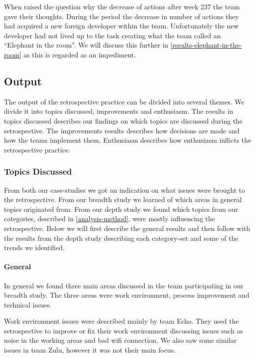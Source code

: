 When raised the question why the decrease of actions after week 237 the team gave their thoughts. During the period the decrease in number of actions they had acquired a new foreign developer within the team. Unfortunately the new developer had not lived up to the task creating what the team called an ``Elephant in the room''. We will discuss this further in \autoref{results-elephant-in-the-room} as this is regarded as an impediment. 



\afterpage{\clearpage}


\subsection{Output}
The output of the retrospective practice can be divided into several themes. We divide it into topics discussed, improvements and enthusiasm. 
The results in topics discussed describes our findings on which topics are discussed during the retrospective. The improvements results describes how decisions are made and how the teams implement them. Enthusiasm describes how enthusiasm inflicts the retrospective practice. 

\subsubsection{Topics Discussed}
From both our case-studies we got an indication on what issues were brought to the retrospective. From our breadth study we learned of which areas in general topics originated from. From our depth study we found which topics from our categories, described in \autoref{analysis-method}, were mostly influencing the retrospective. Below we will first describe the general results and then follow with the results from the depth study describing each category-set and some of the trends we identified. 

\paragraph{General}
In general we found three main areas discussed in the team participating in our breadth study. The three areas were work environment, process improvement and technical issues. 

Work environment issues were described mainly by team Echo. They used the retrospective to improve or fix their work environment discussing issues such as noise in the working areas and bad wifi connection. We also saw some similar issues in team Zulu, however it was not their main focus. 

